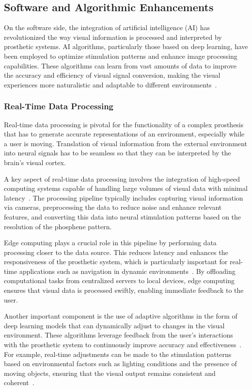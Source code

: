 \documentclass[twocolumn,10pt]{article}
\begin{document}
\subsection*{Software and Algorithmic Enhancements}
On the software side, the integration of artificial intelligence (AI) has
revolutionized the way visual information is processed and interpreted by
prosthetic systems. AI algorithms, particularly those based on deep learning,
have been employed to optimize stimulation patterns and enhance image processing
capabilities. These algorithms can learn from vast amounts of data to improve
the accuracy and efficiency of visual signal conversion, making the visual
experiences more naturalistic and adaptable to different
environments~\parencite{romeniMachineLearningFramework2021}.

\subsubsection*{Real-Time Data Processing}
Real-time data processing is pivotal for the functionality of a complex
prosthesis that has to generate accurate representations of an environment,
especially while a user is moving. Translation of visual information from the
external environment into neural signals has to be seamless so that they can be
interpreted by the brain's visual cortex.

A key aspect of real-time data processing involves the integration of high-speed
computing systems capable of handling large volumes of visual data with minimal
latency~\parencite{nurmikkoChallengesLargeScaleCortical2020}. The processing
pipeline typically includes capturing visual information via cameras,
preprocessing the data to reduce noise and enhance relevant features, and
converting this data into neural stimulation patterns based on the resolution of
the phosphene pattern.

Edge computing plays a crucial role in this pipeline by performing data
processing closer to the data source. This reduces latency and enhances the
responsiveness of the prosthetic system, which is particularly important for
real-time applications such as navigation in dynamic
environments~\parencite{wangDeepLearningEdge2020}. By offloading computational
tasks from centralized servers to local devices, edge computing ensures that
visual data is processed swiftly, enabling immediate feedback to the user.

Another important component is the use of adaptive algorithms in the form of
deep learning models that can dynamically adjust to changes in the visual
environment. These algorithms leverage feedback from the user's interactions
with the prosthetic system to continuously improve accuracy and
effectiveness~\parencite{pio-lopezVisualCorticalProsthesis2021b}. For example,
real-time adjustments can be made to the stimulation patterns based on
environmental factors such as lighting conditions and the presence of moving
objects, ensuring that the visual output remains consistent and
coherent~\parencite{fylstraHumanprosthesisCooperationCombining2022}.
\end{document}
